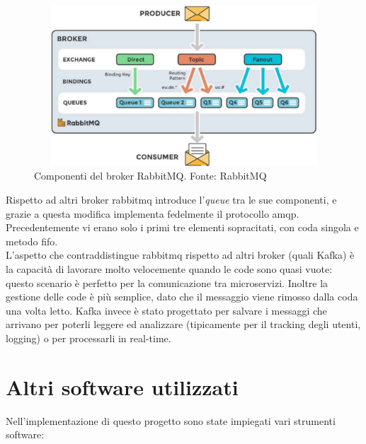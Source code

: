 \begin{figure}[H]
    \centering
    \includegraphics[width=12cm, height=6cm]{images/rabbitmq-componenti.pdf}
    \caption{Componenti del broker RabbitMQ. Fonte: RabbitMQ}
\end{figure}

Rispetto ad altri broker \Gls{rabbitmq} introduce l'\textit{queue} tra le sue componenti, e grazie a questa modifica implementa fedelmente il protocollo \acrshort{amqp}. Precedentemente vi erano solo i primi tre elementi sopracitati, con coda singola e metodo \acrshort{fifo}.\\
L'aspetto che contraddistingue \Gls{rabbitmq} rispetto ad altri broker (quali Kafka) è la capacità di lavorare molto velocemente quando le code sono quasi vuote: questo scenario è perfetto per la comunicazione tra microservizi. Inoltre la gestione delle code è più semplice, dato che il messaggio viene rimosso dalla coda una volta letto. Kafka invece è stato progettato per salvare i messaggi che arrivano per poterli leggere ed analizzare (tipicamente per il tracking degli utenti, logging) o per processarli in real-time.
\section{Altri software utilizzati}\label{software}

Nell'implementazione di questo progetto sono state impiegati vari strumenti software:


